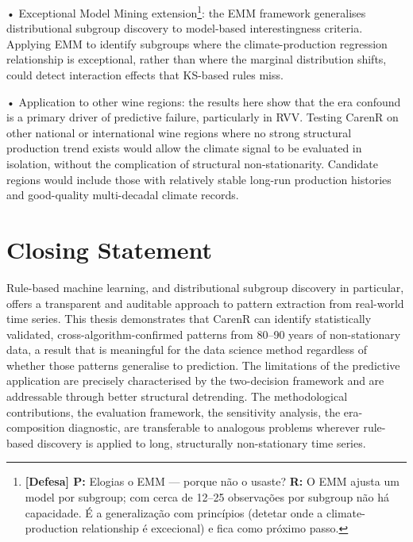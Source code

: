 \noindent •  Exceptional Model Mining extension\footnote{\textbf{[Defesa] P:} Elogias o EMM --- porque não o usaste? \textbf{R:} O EMM ajusta um model por subgroup; com cerca de 12--25 observações por subgroup não há capacidade. É a generalização com princípios (detetar onde a climate-production relationship é excecional) e fica como próximo passo.}: the EMM framework \citep{Duivesteijn2016} generalises distributional subgroup discovery to model-based interestingness criteria. Applying EMM to identify subgroups where the climate-production regression relationship is exceptional, rather than where the marginal distribution shifts, could detect interaction effects that KS-based rules miss.

\noindent •  Application to other wine regions: the results here show that the era confound is a primary driver of predictive failure, particularly in RVV. Testing CarenR on other national or international wine regions where no strong structural production trend exists would allow the climate signal to be evaluated in isolation, without the complication of structural non-stationarity. Candidate regions would include those with relatively stable long-run production histories and good-quality multi-decadal climate records.


\section{Closing Statement}\label{sec:closing_statement}

Rule-based machine learning, and distributional subgroup discovery in particular, offers a transparent and auditable approach to pattern extraction from real-world time series. This thesis demonstrates that CarenR can identify statistically validated, cross-algorithm-confirmed patterns from 80--90 years of non-stationary data, a result that is meaningful for the data science method regardless of whether those patterns generalise to prediction. The limitations of the predictive application are precisely characterised by the two-decision framework and are addressable through better structural detrending. The methodological contributions, the evaluation framework, the sensitivity analysis, the era-composition diagnostic, are transferable to analogous problems wherever rule-based discovery is applied to long, structurally non-stationary time series.

